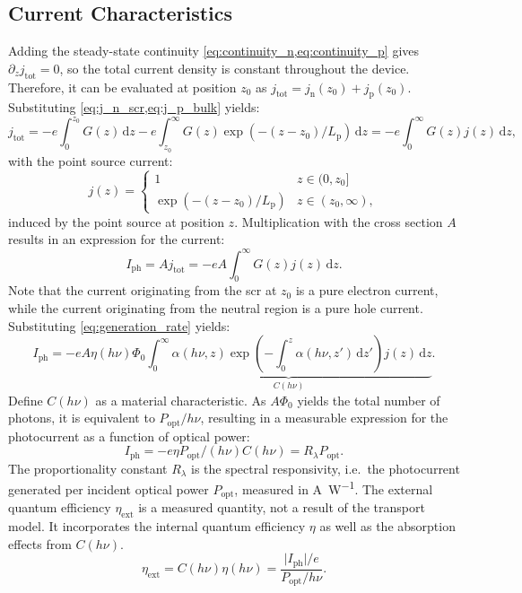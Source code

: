 \subsection{Current Characteristics}

Adding the steady-state continuity \cref{eq:continuity_n,eq:continuity_p} gives $\partial
_{z}j_{\mathrm{tot}}=0$, so the total current density is constant throughout the
device. Therefore, it can be evaluated at position $z_{0}$ as
$j_{\mathrm{tot}}=j_{\mathrm{n}}(z_{0})+j_{\mathrm{p}}(z_{0})$. Substituting \cref{eq:j_n_scr,eq:j_p_bulk}
yields:
\begin{equation}
	j_{\mathrm{tot}}= -e \int_{0}^{z_{0}}G(z)\, \mathrm{d}z - e\int_{z_{0}}^{\infty}
	G(z) \exp(-(z-z_{0})/L_{\mathrm{p}}) \, \mathrm{d}z = -e \int_{0}^{\infty}G(z) j
	(z) \, \mathrm{d}z,
\end{equation}
with the point source current:
\begin{equation}
	j(z)=
	\begin{cases}
		1                               & z \in(0, z_{0}]       \\
		\exp(-(z-z_{0})/L_{\mathrm{p}}) & z \in(z_{0}, \infty),
	\end{cases}
\end{equation}
induced by the point source at position $z$. Multiplication with the cross
section $A$ results in an expression for the current:
\begin{equation}
	I_{\mathrm{ph}}=Aj_{\mathrm{tot}}= -eA \int_{0}^{\infty}G(z)j(z) \, \mathrm{d}z
	. \label{eq:photocurrent}
\end{equation}
Note that the current originating from the \ac{scr} at $z_{0}$ is a pure electron current,
while the current originating from the neutral region is a pure hole current. Substituting
\cref{eq:generation_rate} yields:
\begin{equation}
	I_{\mathrm{ph}}= -eA \eta (h \nu) \Phi_{0}\underbrace{ \int_{0}^{\infty}\alpha(h\nu,
	z)\exp\left( - \int_{0}^{z} \alpha(h\nu, z') \, \mathrm{d}z' \right) j(z) \,
	\mathrm{d}z }_{ C(h\nu) }.
\end{equation}
Define $C(h\nu)$ as a material characteristic. As $A\Phi_{0}$ yields the total number
of photons, it is equivalent to $P_{\mathrm{opt}}/h\nu$, resulting in a measurable
expression for the photocurrent as a function of optical power:
\begin{equation}
	I_{\mathrm{ph}}=-e \eta P_{\mathrm{opt}}/(h\nu) C(h\nu)=R_{\lambda}P_{\mathrm{opt}}.
\end{equation}
The proportionality constant $R_{\lambda}$ is the spectral responsivity, i.e.\ the
photocurrent generated per incident optical power $P_{\mathrm{opt}}$, measured in
\unit{\ampere\per\watt}.
The external quantum efficiency $\eta_{\mathrm{ext}}$ is a measured quantity, not
a result of the transport model. It incorporates the internal quantum efficiency
$\eta$ as well as the absorption effects from $C(h\nu)$.
\begin{equation}
	\eta_{\mathrm{ext}}=C(h\nu) \eta(h\nu) = \frac{\lvert I_{\mathrm{ph}}\rvert /
	e}{ P_{\mathrm{opt}}/ h\nu}.
\end{equation}